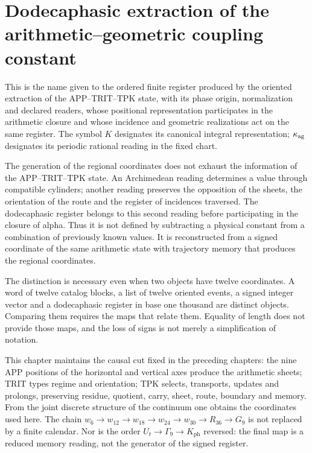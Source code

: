 \section{Dodecaphasic extraction of the arithmetic--geometric coupling constant}
\label{x_reciprocidad:sec:k-registro}

\begin{definition}
\label{x_reciprocidad:lib01:definicion}
This is the name given to the ordered finite register produced by the oriented
extraction of the APP--TRIT--TPK state, with its phase origin, normalization and
declared readers, whose positional representation participates in the
arithmetic closure and whose incidence and geometric realizations act
on the same register. The symbol \(K\) designates its canonical integral
representation; \(\kappa_{\rm ag}\) designates its periodic rational
reading in the fixed chart.
\end{definition}

The generation of the regional coordinates does not exhaust the information of the
APP--TRIT--TPK state. An Archimedean reading determines a value through
compatible cylinders; another reading preserves the opposition of the sheets, the
orientation of the route and the register of incidences traversed. The
dodecaphasic register belongs to this second reading before participating in
the closure of alpha. Thus it is not defined by subtracting a physical constant from
a combination of previously known values. It is reconstructed from a
signed coordinate of the same arithmetic state with trajectory memory that produces the regional
coordinates.

The distinction is necessary even when two objects have twelve
coordinates. A word of twelve catalog blocks, a list of twelve
oriented events, a signed integer vector and a dodecaphasic register in base one thousand are
distinct objects. Comparing them requires the maps that
relate them. Equality of length does not provide those maps, and the
loss of signs is not merely a simplification of notation.

This chapter maintains the causal cut fixed in the preceding chapters:
the nine APP positions of the horizontal and vertical axes produce the
arithmetic sheets; TRIT types regime and orientation; TPK selects,
transports, updates and prolongs, preserving residue, quotient, carry,
sheet, route, boundary and memory. From the joint discrete structure of the
continuum one obtains the coordinates used here. The chain
\(w_6\to w_{12}\to w_{18}\to w_{24}\to w_{30}\to R_{36}\to G_9\)
is not replaced by a finite calendar. Nor is the order
\(U_t\to\Gamma_9\to K_{\mathrm{ph}}\) reversed: the final map is a
reduced memory reading, not the generator of the signed register.


